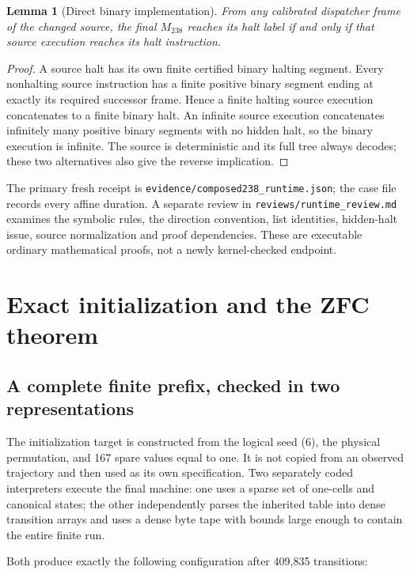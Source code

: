 \documentclass[11pt]{article}
\newtheorem{lemma}[theorem]{Lemma}
\theoremstyle{definition}\newtheorem{definition}[theorem]{Definition}
\newcommand{\file}[1]{\nolinkurl{#1}}
\begin{document}
\begin{lemma}[Direct binary implementation]
From any calibrated dispatcher frame of the changed source, the final
$M_{238}$ reaches its halt label if and only if that source execution
reaches its halt instruction.
\end{lemma}

\begin{proof}
A source halt has its own finite certified binary halting segment.
Every nonhalting source instruction has a finite positive binary segment
ending at exactly its required successor frame.  Hence a finite halting
source execution concatenates to a finite binary halt.  An infinite
source execution concatenates infinitely many positive binary segments
with no hidden halt, so the binary execution is infinite.  The source
is deterministic and its full tree always decodes; these two alternatives
also give the reverse implication.
\end{proof}

The primary fresh receipt is \file{evidence/composed238_runtime.json};
the case file records every affine duration.  A separate review in
\file{reviews/runtime_review.md} examines the symbolic rules, the direction
convention, list identities, hidden-halt issue, source normalization and
proof dependencies.  These are executable ordinary mathematical proofs,
not a newly kernel-checked endpoint.

\section{Exact initialization and the ZFC theorem}
\label{sec:boot}

\subsection{A complete finite prefix, checked in two representations}

The initialization target is constructed from the logical seed (6), the
physical permutation, and 167 spare values equal to one.  It is not copied
from an observed trajectory and then used as its own specification.
Two separately coded interpreters execute the final machine: one uses a
sparse set of one-cells and canonical states; the other independently
parses the inherited table into dense transition arrays and uses a dense
byte tape with bounds large enough to contain the entire finite run.

Both produce exactly the following configuration after 409,835 transitions:
\end{document}
